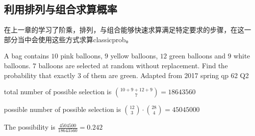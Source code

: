 \subsection*{利用排列与组合求算概率}
在上一章的学习了阶乘，排列，与组合能够快速求算满足特定要求的步骤，在这一部分当中会使用这些方式求算\gls{classicprob}。
\begin{ExampleBox}
A bag contains $10$ pink balloons, $9$ yellow balloons, $12$ green balloons and $9$ white balloons. $7$ balloons are selected at random without replacement. Find the probability that exactly $3$ of them are green.
\makebox{}\hfill Adapted from 2017 spring qp 62 Q2

\tcblower
total number of possible selection is $\binom{10+9+12+9}{7} = 18643560$

possible number of possible selection is $\binom{12}{3}\cdot \binom{28}{4} = 45045000$

The possibility is $\frac{4504500}{18643560}=0.242$
\end{ExampleBox}
